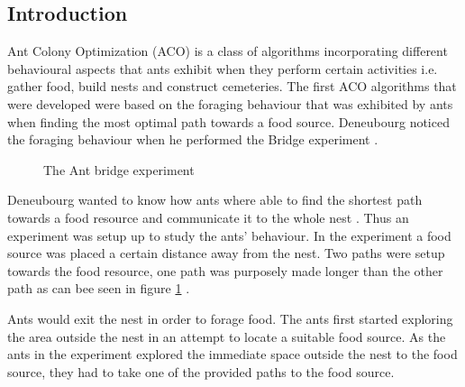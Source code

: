 \subsection{Introduction}
\label{sec:ACOverview}
Ant Colony Optimization (ACO) is a class of algorithms incorporating different behavioural aspects that ants exhibit when they perform certain activities i.e. gather food, build nests and construct cemeteries\cite{AntsAndStigmergy,CompuIntelligenceIntro}. The first ACO algorithms that were developed were based on the foraging behaviour that was exhibited by ants when finding the most optimal path towards a food source. Deneubourg noticed the foraging behaviour when he performed the Bridge experiment \cite{AntsAndStigmergy,CompuIntelligenceIntro}.
\begin{figure}[b!]
	\centering
	\setlength \fboxsep{0pt}
	\setlength \fboxrule{0.5pt}
	\caption{The Ant bridge experiment \cite{AntsAndStigmergy}}
	\label{fig:antBridgeExperiment}
\end{figure}

Deneubourg wanted to know how ants where able to find the shortest path towards a food resource and communicate it to the whole nest \cite{AntsAndStigmergy}. Thus an experiment was setup up to study the ants' behaviour. In the experiment a food source was placed a certain distance away from the nest\cite{AntsAndStigmergy,CompuIntelligenceIntro}. Two paths were setup towards the food resource, one path was purposely made longer than the other path as can bee seen in figure \ref{fig:antBridgeExperiment} \cite{AntsAndStigmergy}.

Ants would exit the nest in order to forage food\cite{AntsAndStigmergy,CompuIntelligenceIntro}. The ants first started exploring the area outside the nest in an attempt to locate a suitable food source\cite{AntsAndStigmergy,CompuIntelligenceIntro}. As the ants in the experiment explored the immediate space outside the nest to the food source, they had to take one of the provided paths to the food source\cite{AntsAndStigmergy}.

